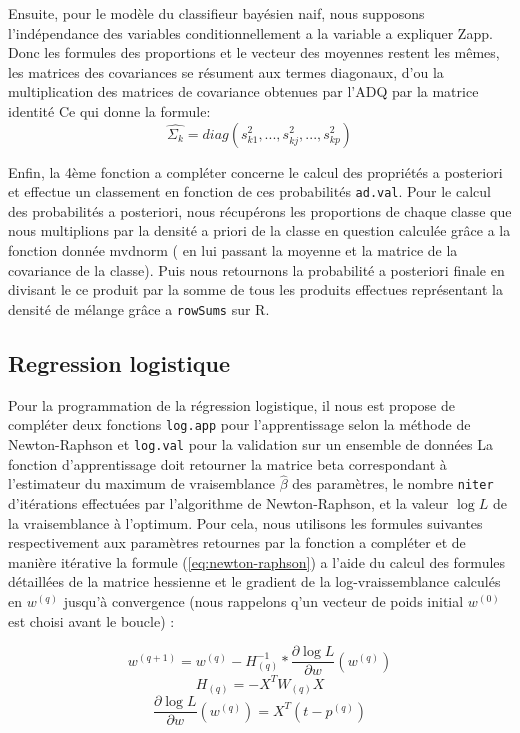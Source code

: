 \documentclass[10pt]{article}
\begin{document}
	Ensuite, pour le modèle du classifieur bayésien naif, nous supposons l'indépendance des variables conditionnellement a la variable a expliquer Zapp. Donc les formules des proportions et le vecteur des moyennes restent les mêmes, les matrices des covariances se résument aux termes diagonaux, d'ou la multiplication des matrices de covariance obtenues par l'ADQ par la matrice identité Ce qui donne la formule:  
	 \begin{equation*}
	 \widehat{\Sigma_{k}} = diag(s_{k1}^{2}, ... ,s_{kj}^{2}, ..., s_{kp}^{2} )
	 \end{equation*}
	 
	 Enfin, la 4ème fonction a compléter concerne le calcul des propriétés a posteriori et effectue un classement en fonction de ces probabilités \texttt{ad.val}. Pour le calcul des probabilités a posteriori, nous récupérons les proportions de chaque classe que nous multiplions par la densité a priori de la classe en question calculée grâce a la fonction donnée mvdnorm ( en lui passant la moyenne et la matrice de la covariance de la classe). Puis nous retournons la probabilité a posteriori finale en divisant le ce produit par la somme de tous les produits effectues représentant la densité de mélange grâce a \texttt{rowSums} sur R. 
	 
	\subsection{Regression logistique}
	
	Pour la programmation de la régression logistique, il nous est propose de compléter deux fonctions \texttt{log.app} pour l'apprentissage selon la méthode de Newton-Raphson et \texttt{log.val} pour la validation sur un ensemble de données La fonction d'apprentissage doit retourner la matrice beta correspondant à l'estimateur du maximum de vraisemblance $\widehat{\beta}$ des paramètres, le nombre \texttt{niter} d'itérations effectuées par l'algorithme de Newton-Raphson, et la valeur $\log L$ de la vraisemblance à l'optimum.
	Pour cela, nous utilisons les formules suivantes respectivement aux paramètres retournes par la fonction a compléter et de manière itérative la formule (\ref{eq:newton-raphson}) a l'aide du calcul des formules détaillées de la matrice hessienne et le gradient de la log-vraissemblance calculés en $w^{(q)}$  jusqu'à convergence (nous rappelons q'un vecteur de poids initial $w^{(0)}$ est choisi avant le boucle) : 
	
	\begin{equation} \label{eq:newton-raphson}
	w^{(q+1)} = w^{(q)}-H^{-1}_{(q)}*\dfrac{\partial \log L}{\partial w}(w^{(q)})
	\end{equation}
	\begin{equation*}
	H_{(q)} = -X^{T}W_{(q)}X
	\end{equation*}
	\begin{equation*}
	\dfrac{\partial \log L}{\partial w}(w^{(q)}) = X^{T}(t-p^{(q)})
	\end{equation*}
	
\end{document}
